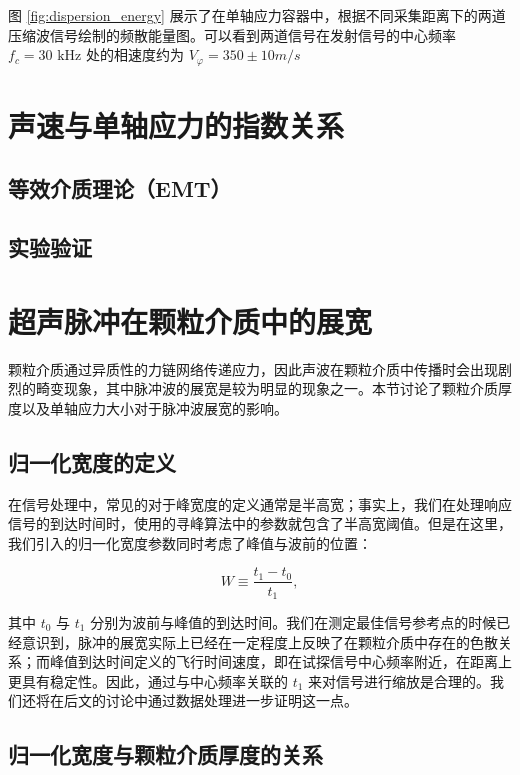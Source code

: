 图 \ref{fig:dispersion_energy} 展示了在单轴应力容器中，根据不同采集距离下的两道压缩波信号绘制的频散能量图。可以看到两道信号在发射信号的中心频率 $f_{c} = 30\text{ kHz}$ 处的相速度约为 $V_{\varphi} = 350\pm 10\unit{m/s}$

\section{声速与单轴应力的指数关系}

\subsection{等效介质理论（EMT）}

\subsection{实验验证}

\section{超声脉冲在颗粒介质中的展宽}

颗粒介质通过异质性的力链网络传递应力，因此声波在颗粒介质中传播时会出现剧烈的畸变现象，其中脉冲波的展宽是较为明显的现象之一。本节讨论了颗粒介质厚度以及单轴应力大小对于脉冲波展宽的影响。

\subsection{归一化宽度的定义}

在信号处理中，常见的对于峰宽度的定义通常是半高宽；事实上，我们在处理响应信号的到达时间时，使用的寻峰算法中的参数就包含了半高宽阈值。但是在这里，我们引入的归一化宽度参数同时考虑了峰值与波前的位置：

\begin{equation}
  W \equiv \frac{t_{1}-t_{0}}{t_{1}},
\end{equation}

其中 $t_{0}$ 与 $t_{1}$ 分别为波前与峰值的到达时间。我们在测定最佳信号参考点的时候已经意识到，脉冲的展宽实际上已经在一定程度上反映了在颗粒介质中存在的色散关系；而峰值到达时间定义的飞行时间速度，即在试探信号中心频率附近，在距离上更具有稳定性。因此，通过与中心频率关联的 $t_{1}$ 来对信号进行缩放是合理的。我们还将在后文的讨论中通过数据处理进一步证明这一点。

\subsection{归一化宽度与颗粒介质厚度的关系}

